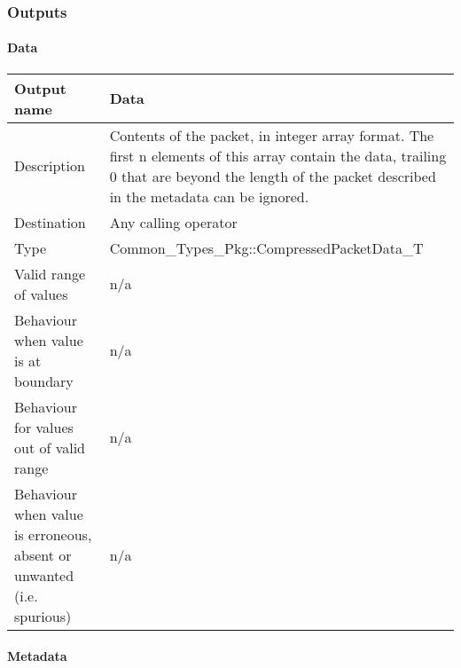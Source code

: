 
\subsubsection{Outputs}\label{s:trackside_outputs}


\paragraph{Data}

\begin{longtable}{p{}p{}}
\toprule
Output name				& Data \\
\midrule
Description				& Contents of the packet, in integer array format. The first n elements of this array contain the data, trailing 0 that are beyond the length of the packet described in the metadata can be ignored. \\
\midrule
Destination				& Any calling operator\\ 
\midrule
Type					& Common\_Types\_Pkg::CompressedPacketData\_T\\
\midrule
Valid range of values	& n/a 

 \\
\midrule
Behaviour when value is at boundary	& n/a \\
\midrule
Behaviour for values out of valid range	& n/a\newline


 \\
\midrule
Behaviour when value is erroneous, absent or unwanted (i.e. spurious) & n/a \\
\bottomrule
\end{longtable}



\paragraph{Metadata}

